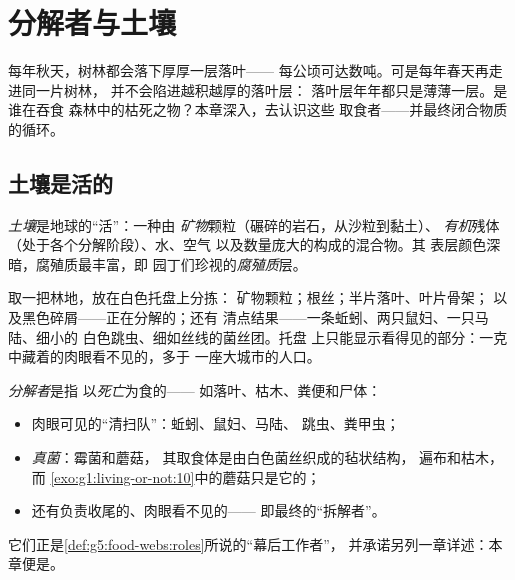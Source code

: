 \chapter{分解者与土壤}\label{ch:g6:decomposers-and-soil}

每年秋天，树林都会落下厚厚一层落叶——
每公顷可达数吨。可是每年春天再走进同一片树林，
并不会陷进越积越厚的落叶层：
落叶层年年都只是薄薄一层。是谁在吞食
森林中的枯死之物？本章深入，去认识这些
取食者——并最终闭合物质的循环。

\section{土壤是活的}

\begin{definition}[土壤]\label{def:g6:decomposers-and-soil:soil}
\emph{土壤}是地球的“活”：一种由
\emph{矿物}颗粒（碾碎的岩石，从沙粒到黏土）、
\emph{有机}残体（处于各个分解阶段）、水、空气
以及数量庞大的构成的混合物。其
表层颜色深暗，腐殖质最丰富，即
园丁们珍视的\emph{腐殖质}层。
\end{definition}

\begin{example}[一把土的生物普查]\label{ex:g6:decomposers-and-soil:handful}
取一把林地，放在白色托盘上分拣：
矿物颗粒；根丝；半片落叶、叶片骨架；
以及黑色碎屑——正在分解的；还有
清点结果——一条蚯蚓、两只鼠妇、一只马陆、细小的
白色跳虫、细如丝线的菌丝团。托盘
上只能显示看得见的部分：一克
中藏着的肉眼看不见的，多于
一座大城市的人口。
\end{example}

\begin{definition}[分解者]\label{def:g6:decomposers-and-soil:decomposers}
\emph{分解者}是指
以\emph{死亡}为食的——
如落叶、枯木、粪便和尸体：
\begin{itemize}
  \item 肉眼可见的“清扫队”：蚯蚓、鼠妇、马陆、
        跳虫、粪甲虫；
  \item \emph{真菌}：霉菌和蘑菇，
        其取食体是由白色菌丝织成的毡状结构，
        遍布和枯木，而
        \cref{exo:g1:living-or-not:10}中的蘑菇只是它的；
  \item 还有负责收尾的、肉眼看不见的——
        即最终的“拆解者”。
\end{itemize}
它们正是\cref{def:g5:food-webs:roles}所说的“幕后工作者”，
并承诺另列一章详述：本章便是。
\end{definition}

